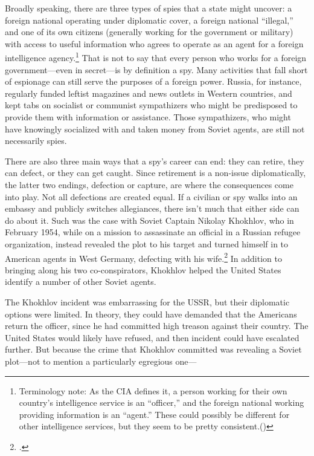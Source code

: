 \documentclass{report}
\begin{document}
\begin{refsegment}
Broadly speaking, there are three types of spies that a state might uncover: a foreign national operating under diplomatic cover, a foreign national ``illegal,'' and one of its own citizens (generally working for the government or military) with access to useful information who agrees to operate as an agent for a foreign intelligence agency.\footnote{Terminology note: As the CIA defines it, a person working for their own country's intelligence service is an ``officer,'' and the foreign national working providing information is an ``agent.'' These could possibly be different for other intelligence services, but they seem to be pretty consistent.(\cite{cia_insider_2019})} That is not to say that every person who works for a foreign government---even in secret---is by definition a spy. Many activities that fall short of espionage can still serve the purposes of a foreign power. Russia, for instance, regularly funded leftist magazines and news outlets in Western countries, and kept tabs on socialist or communist sympathizers who might be predisposed to provide them with information or assistance. Those sympathizers, who might have knowingly socialized with and taken money from Soviet agents, are still not necessarily spies.

There are also three main ways that a spy's career can end: they can retire, they can defect, or they can get caught. Since retirement is a non-issue diplomatically, the latter two endings, defection or capture, are where the consequences come into play. Not all defections are created equal. If a civilian or spy walks into an embassy and publicly switches allegiances, there isn't much that either side can do about it. Such was the case with Soviet Captain Nikolay Khokhlov, who in February 1954, while on a mission to assassinate an official in a Russian refugee organization, instead revealed the plot to his target and turned himself in to American agents in West Germany, defecting with his wife.\footcite[Captain Khoklov repeatedly emphasized at the press conference that his decision to defect was inspired by his wife Yanina, who told him that ``she would never permit their child to have an assasin as a father.'']{handler_another_1954} In addition to bringing along his two co-conspirators, Khokhlov helped the United States identify a number of other Soviet agents.

The Khokhlov incident was embarrassing for the USSR, but their diplomatic options were limited. In theory, they could have demanded that the Americans return the officer, since he had committed high treason against their country. The United States would likely have refused, and then incident could have escalated further. But because the crime that Khokhlov committed was revealing a Soviet plot---not to mention a particularly egregious one---


\end{refsegment}
\end{document}
